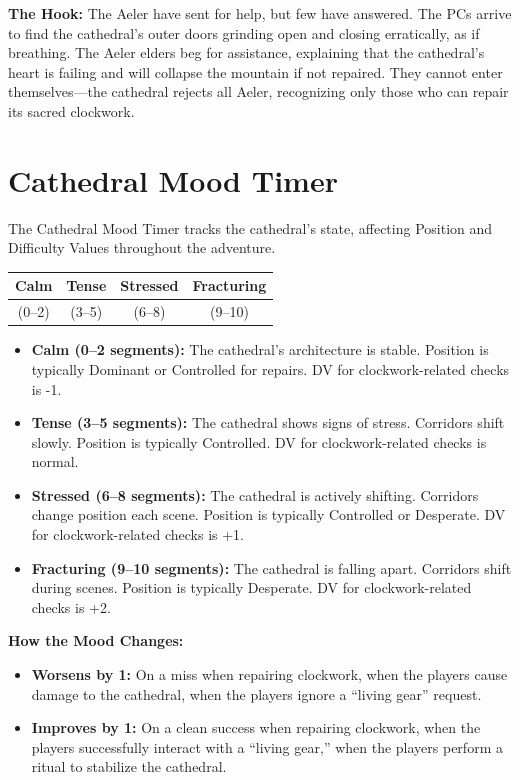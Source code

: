 \documentclass{article}
\begin{document}
\begin{storybox}
\textbf{The Hook:} The Aeler have sent for help, but few have answered. The PCs arrive to find the cathedral's outer doors grinding open and closing erratically, as if breathing. The Aeler elders beg for assistance, explaining that the cathedral's heart is failing and will collapse the mountain if not repaired. They cannot enter themselves---the cathedral rejects all Aeler, recognizing only those who can repair its sacred clockwork.
\end{storybox}

\section{Cathedral Mood Timer }

The Cathedral Mood Timer tracks the cathedral's state, affecting Position and Difficulty Values throughout the adventure.

\begin{center}
\begin{longtable}{|c|c|c|c|}
\hline
\textbf{Calm} & \textbf{Tense} & \textbf{Stressed} & \textbf{Fracturing} \\
\hline
(0--2) & (3--5) & (6--8) & (9--10) \\
\hline
\end{longtable}
\end{center}

\begin{itemize}
    \item \textbf{Calm (0--2 segments):} The cathedral's architecture is stable. Position is typically Dominant or Controlled for repairs. DV for clockwork-related checks is -1.
    \item \textbf{Tense (3--5 segments):} The cathedral shows signs of stress. Corridors shift slowly. Position is typically Controlled. DV for clockwork-related checks is normal.
    \item \textbf{Stressed (6--8 segments):} The cathedral is actively shifting. Corridors change position each scene. Position is typically Controlled or Desperate. DV for clockwork-related checks is +1.
    \item \textbf{Fracturing (9--10 segments):} The cathedral is falling apart. Corridors shift during scenes. Position is typically Desperate. DV for clockwork-related checks is +2.
\end{itemize}

\textbf{How the Mood Changes:}
\begin{itemize}
    \item \textbf{Worsens by 1:} On a miss when repairing clockwork, when the players cause damage to the cathedral, when the players ignore a ``living gear'' request.
    \item \textbf{Improves by 1:} On a clean success when repairing clockwork, when the players successfully interact with a ``living gear,'' when the players perform a ritual to stabilize the cathedral.
\end{itemize}
\end{document}
